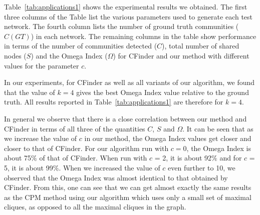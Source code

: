 




Table~\ref{tab:applications1} shows the experimental results we obtained.
The first three columns of the Table list the various parameters used to generate each test network. The fourth column lists the number of ground truth communities ($C(GT)$) in each network.  The remaining columns in the table show performance 
in terms of the number of communities detected ($C$), 
total number of shared nodes ($S$) and the Omega Index ($\Omega$) for 
CFinder and our method with different values for the parameter $c$.

In our experiments, for CFinder as well as all variants of our algorithm, 
we found that the value of $k=4$ gives the best Omega Index value relative 
to the ground truth. All results reported in Table~\ref{tab:applications1} are therefore
for $k=4$.

In general we observe that there is a close correlation between our method and CFinder
in terms of all three of the quantities $C$, $S$ and $\Omega$. It can be seen that as we increase the value of $c$ in our method, the Omega Index values get closer and closer to that of CFinder. For our algorithm run with $c=0$, the Omega Index is about 75$\%$ of that of CFinder. When run with $c$ = 2, it is about 92$\%$ and for $c$ = 5, it is about 99$\%$. When we increased the value of $c$ even further to 10, we observed that the Omega Index was almost identical to that obtained by CFinder. From this, one can see that we can get almost exactly the same results as the CPM method using our algorithm which uses only a small set of 
maximal cliques, as opposed to all the maximal cliques in the graph.


